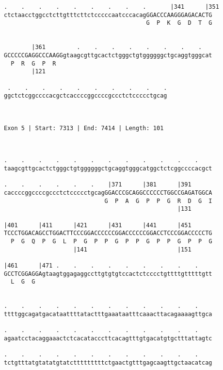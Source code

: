 \documentclass{article}
\begin{document}
\begin{Verbatim}
.    .    .    .    .    .    .    .    .       |341      |351
ctctaacctggcctcttgtttcttctcccccaatcccacagGGACCCAAGGGAGACACTG
                                         G  P  K  G  D  T  G
                                                            
  
        |361         .    .    .    .    .    .    .    .   
GCCCCCGAGGCCCAAGGgtaagcgttgcactctgggctgtggggggctgcaggtgggcat
  P  R  G  P  R                                             
        |121                                                
  
 .    .    .    .    .    .    .    .    .    .
ggctctcggccccacgctcaccccggccccgccctctccccctgcag
                                               
                                               
 
Exon 5 | Start: 7313 | End: 7414 | Length: 101



.    .    .    .    .    .    .    .    .    .    .    .    
taagcgttgcactctgggctgtggggggctgcaggtgggcatggctctcggccccacgct
                                                            
.    .    .    .    .    .    |371      |381      |391      
caccccggccccgccctctccccctgcagGGACCCGCAGGCCCCCCTGGCCGAGATGGCA
                             G  P  A  G  P  P  G  R  D  G  I
                                                  |131      
  
|401      |411      |421      |431      |441      |451      
TCCCTGGACAGCCTGGACTTCCCGGACCCCCCGGACCCCCCGGACCTCCCGGACCCCCTG
  P  G  Q  P  G  L  P  G  P  P  G  P  P  G  P  P  G  P  P  G
                    |141                          |151      
  
|461      |471 .    .    .    .    .    .    .    .    .    
GCCTCGGAGGAgtaagtggagaggccttgtgtgtccactctcccctgttttgtttttgtt
  L  G  G                                                   
                                                            
  
.    .    .    .    .    .    .    .    .    .    .    .    
ttttggcagatgacataattttatactttgaaataatttcaaacttacagaaaagttgca
                                                            
.    .    .    .    .    .    .    .    .    .    .    .    
agaatcctacaggaaactctcacatacccttcacagtttgtgacatgtgctttattagtc
                                                            
.    .    .    .    .    .    .    .    .    .    .    .    
tctgtttatgtatatgtatctttttttttctgaactgtttgagcaagttgctaacatcag
                                                            

\end{Verbatim}
\end{document}
